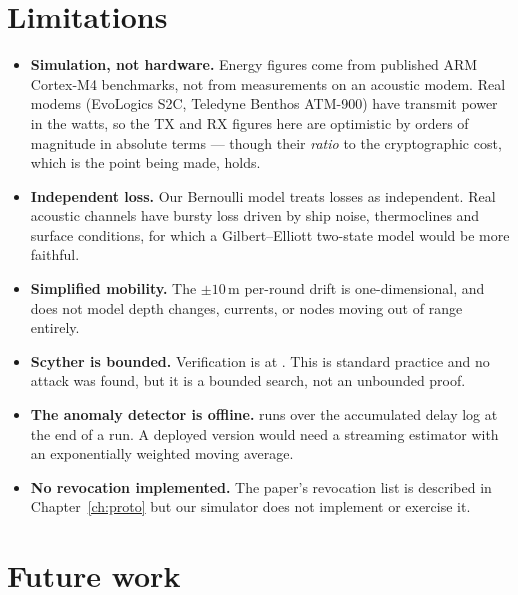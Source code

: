 \section{Limitations}

\begin{itemize}
\item \textbf{Simulation, not hardware.} Energy figures come from published ARM Cortex-M4
      benchmarks, not from measurements on an acoustic modem. Real modems (EvoLogics S2C,
      Teledyne Benthos ATM-900) have transmit power in the watts, so the TX and RX figures
      here are optimistic by orders of magnitude in absolute terms --- though their
      \emph{ratio} to the cryptographic cost, which is the point being made, holds.
\item \textbf{Independent loss.} Our Bernoulli model treats losses as independent. Real
      acoustic channels have bursty loss driven by ship noise, thermoclines and surface
      conditions, for which a Gilbert--Elliott two-state model would be more faithful.
\item \textbf{Simplified mobility.} The $\pm10$\,m per-round drift is one-dimensional, and
      does not model depth changes, currents, or nodes moving out of range entirely.
\item \textbf{Scyther is bounded.} Verification is at . This is standard
      practice and no attack was found, but it is a bounded search, not an unbounded proof.
\item \textbf{The anomaly detector is offline.}  runs over the
      accumulated delay log at the end of a run. A deployed version would need a streaming
      estimator with an exponentially weighted moving average.
\item \textbf{No revocation implemented.} The paper's revocation list is described in
      Chapter~\ref{ch:proto} but our simulator does not implement or exercise it.
\end{itemize}

\section{Future work}

